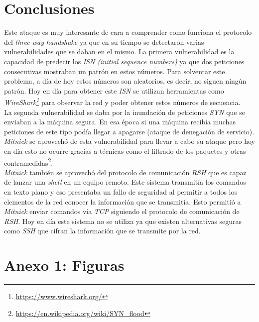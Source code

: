 \documentclass{article}
\begin{document}
\section{Conclusiones}

Este ataque es muy interesante de cara a comprender como funciona el protocolo del \textit{three-way handshake} ya que en su tiempo se detectaron varias vulnerabilidades que se daban en el mismo. La primera vulnerabilidad es la capacidad de predecir los \textit{ISN (initial sequence numbers)} ya que dos peticiones consecutivas mostraban un patrón en estos números. Para solventar este problema, a día de hoy estos números son aleatorios, es decir, no siguen ningún patrón. Hoy en día para obtener este \textit{ISN} se utilizan herramientas como \textit{WireShark\footnote{\url{https://www.wireshark.org/}}} para observar la red y poder obtener estos números de secuencia.\\
La segunda vulnerabilidad se daba por la inundación de peticiones \textit{SYN} que se enviaban a la máquina segura. En esa época si una máquina recibía muchas peticiones de este tipo podía llegar a apagarse (ataque de denegación de servicio). \textit{Mitnick} se aprovechó de esta vulnerabilidad para llevar a cabo su ataque pero hoy en día esto no ocurre gracias a técnicas como el filtrado de los paquetes y otras contramedidas\footnote{\url{https://en.wikipedia.org/wiki/SYN_flood}}.\\
\textit{Mitnick} también se aprovechó del protocolo de comunicación \textit{RSH} que es capaz de lanzar una \textit{shell} en un equipo remoto. Este sistema transmitía los comandos en texto plano y eso presentaba un fallo de seguridad al permitir a todos los elementos de la red conocer la información que se transmitía. Esto permitió a \textit{Mitnick} enviar comandos vía \textit{TCP} siguiendo el protocolo de comunicación de \textit{RSH}. Hoy en día este sistema no se utiliza ya que existen alternativas seguras como \textit{SSH} que cifran la información que se transmite por la red.\\


\newpage
{}
\section*{Anexo 1: Figuras}
\end{document}
